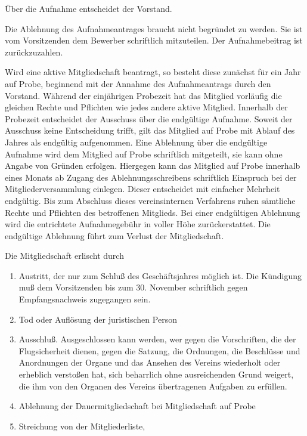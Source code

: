 \documentclass[10pt,a4paper,parskip=half]{scrartcl}
\begin{document}
\begin{contract}
    Über die Aufnahme entscheidet der Vorstand.
    
    Die Ablehnung des Aufnahmeantrages braucht nicht begründet zu werden.
    Sie ist vom Vorsitzenden dem Bewerber schriftlich mitzuteilen.
    Der Aufnahmebeitrag ist zurückzuzahlen.

    Wird eine aktive Mitgliedschaft beantragt,
    so besteht diese zunächst für ein Jahr auf Probe,
    beginnend mit der Annahme des Aufnahmeantrags durch den Vorstand.
    Während der einjährigen Probezeit hat das Mitglied vorläufig die gleichen Rechte und Pflichten wie jedes andere aktive Mitglied.
    Innerhalb der Probezeit entscheidet der Ausschuss über die endgültige Aufnahme.
    Soweit der Ausschuss keine Entscheidung trifft,
    gilt das Mitglied auf Probe mit Ablauf des Jahres als endgültig aufgenommen.
    Eine Ablehnung über die endgültige Aufnahme wird dem Mitglied auf Probe schriftlich mitgeteilt,
    sie kann ohne Angabe von Gründen erfolgen.
    Hiergegen kann das Mitglied auf Probe innerhalb eines Monats ab Zugang des Ablehnungsschreibens schriftlich Einspruch bei der Mitgliederversammlung einlegen.
    Dieser entscheidet mit einfacher Mehrheit endgültig.
    Bis zum Abschluss dieses vereinsinternen Verfahrens ruhen sämtliche Rechte und Pflichten des betroffenen Mitglieds.
    Bei einer endgültigen Ablehnung wird die entrichtete Aufnahmegebühr in voller Höhe zurückerstattet.
    Die endgültige Ablehnung führt zum Verlust der Mitgliedschaft.
    
    \label{C:ErloeschenDerMitgliedschaft}
    Die Mitgliedschaft erlischt durch
    \begin{enumerate}[label=\alph*)]
      \item Austritt,
            der nur zum Schluß des Geschäftsjahres möglich ist.
            Die Kündigung muß dem Vorsitzenden bis zum 30. November schriftlich gegen Empfangsnachweis zugegangen sein.
      \item Tod oder Auflösung der juristischen Person
      \item{Ausschluß.} Ausgeschlossen kann werden,
            wer gegen die Vorschriften,
            die der Flugsicherheit dienen,
            gegen die Satzung,
            die Ordnungen,
            die Beschlüsse und Anordnungen der Organe und das Ansehen des Vereins wiederholt oder erheblich verstoßen hat,
            sich beharrlich ohne ausreichenden Grund weigert,
            die ihm von den Organen des Vereins übertragenen Aufgaben zu erfüllen.\label{S:Ausschluss}
      \item Ablehnung der Dauermitgliedschaft bei Mitgliedschaft auf Probe
      \item Streichung von der Mitgliederliste,            
    \end{enumerate}


\end{contract}
\end{document}
